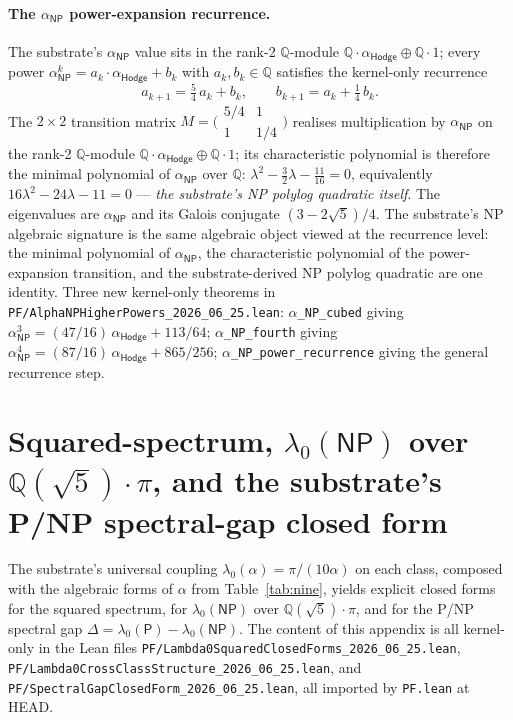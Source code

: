 \documentclass[11pt,a4paper]{amsart}
\theoremstyle{plain}
\theoremstyle{definition}
\begin{document}
\paragraph{The $\alpha_{\textsf{NP}}$ power-expansion recurrence.} The substrate's $\alpha_{\textsf{NP}}$ value sits in the rank-2 $\mathbb{Q}$-module $\mathbb{Q}\cdot\alpha_{\textsf{Hodge}}\oplus\mathbb{Q}\cdot 1$; every power $\alpha_{\textsf{NP}}^{k} = a_k\cdot\alpha_{\textsf{Hodge}} + b_k$ with $a_k, b_k \in \mathbb{Q}$ satisfies the kernel-only recurrence
\[
a_{k+1} = \tfrac{5}{4}\,a_k + b_k,\qquad b_{k+1} = a_k + \tfrac{1}{4}\,b_k.
\]
The $2\times 2$ transition matrix $M = \bigl(\begin{smallmatrix}5/4 & 1\\ 1 & 1/4\end{smallmatrix}\bigr)$ realises multiplication by $\alpha_{\textsf{NP}}$ on the rank-2 $\mathbb{Q}$-module $\mathbb{Q}\cdot\alpha_{\textsf{Hodge}}\oplus\mathbb{Q}\cdot 1$; its characteristic polynomial is therefore the minimal polynomial of $\alpha_{\textsf{NP}}$ over $\mathbb{Q}$: $\lambda^2 - \tfrac{3}{2}\lambda - \tfrac{11}{16} = 0$, equivalently $16\lambda^2 - 24\lambda - 11 = 0$ --- \emph{the substrate's NP polylog quadratic itself}. The eigenvalues are $\alpha_{\textsf{NP}}$ and its Galois conjugate $(3 - 2\sqrt{5})/4$. The substrate's NP algebraic signature is the same algebraic object viewed at the recurrence level: the minimal polynomial of $\alpha_{\textsf{NP}}$, the characteristic polynomial of the power-expansion transition, and the substrate-derived NP polylog quadratic are one identity. Three new kernel-only theorems in \texttt{PF/AlphaNPHigherPowers\_2026\_06\_25.lean}: \texttt{$\alpha$\_NP\_cubed} giving $\alpha_{\textsf{NP}}^{3} = (47/16)\,\alpha_{\textsf{Hodge}} + 113/64$; \texttt{$\alpha$\_NP\_fourth} giving $\alpha_{\textsf{NP}}^{4} = (87/16)\,\alpha_{\textsf{Hodge}} + 865/256$; \texttt{$\alpha$\_NP\_power\_recurrence} giving the general recurrence step.

\section{Squared-spectrum, $\lambda_0(\textsf{NP})$ over $\mathbb{Q}(\sqrt{5})\cdot\pi$, and the substrate's P/NP spectral-gap closed form}\label{app:lambdasq}

The substrate's universal coupling $\lambda_0(\alpha) = \pi/(10\alpha)$ on each class, composed with the algebraic forms of $\alpha$ from Table~\ref{tab:nine}, yields explicit closed forms for the squared spectrum, for $\lambda_0(\textsf{NP})$ over $\mathbb{Q}(\sqrt{5})\cdot\pi$, and for the P/NP spectral gap $\Delta = \lambda_0(\textsf{P}) - \lambda_0(\textsf{NP})$. The content of this appendix is all kernel-only in the Lean files \texttt{PF/Lambda0SquaredClosedForms\_2026\_06\_25.lean}, \texttt{PF/Lambda0CrossClassStructure\_2026\_06\_25.lean}, and \texttt{PF/SpectralGapClosedForm\_2026\_06\_25.lean}, all imported by \texttt{PF.lean} at HEAD.
\end{document}
